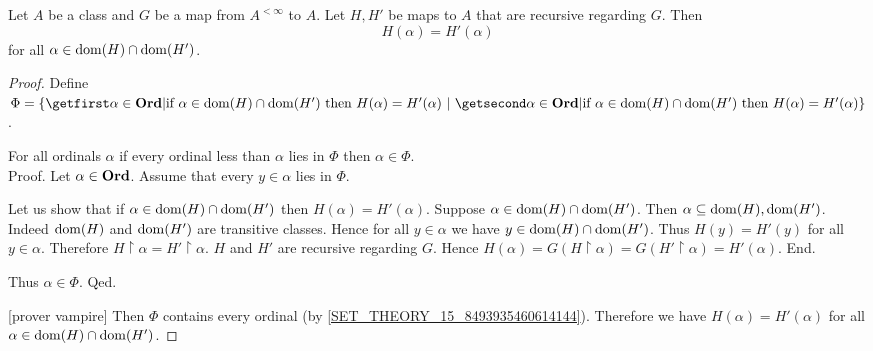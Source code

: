 \documentclass[../../set-theory/set-theory.tex]{subfiles}
\begin{document}
  \begin{forthel}
    \begin{proposition}
      Let $A$ be a class and $G$ be a map from $A^{< \infty}$ to $A$.
      Let $H, H'$ be maps to $A$ that are recursive regarding $G$.
      Then \[ H(\alpha) = H'(\alpha) \]
      for all $\alpha \in \operatorname{dom}(H) \cap \operatorname{dom}(H')$.
    \end{proposition}
    \begin{proof}
      Define $\Phi = \class{\alpha \in \Ord | \text{if $\alpha \in
      \dom(H) \cap \dom(H')$ then $H(\alpha) = H'(\alpha)$}}$.

      For all ordinals $\alpha$ if every ordinal less than $\alpha$ lies in
      $\Phi$ then $\alpha \in \Phi$. \\
      Proof.
        Let $\alpha \in \mathbf{Ord}$.
        Assume that every $y \in \alpha$ lies in $\Phi$.

        Let us show that if $\alpha \in \operatorname{dom}(H) \cap \operatorname{dom}(H')$ then
        $H(\alpha) = H'(\alpha)$.
          Suppose $\alpha \in \operatorname{dom}(H) \cap \operatorname{dom}(H')$.
          Then $\alpha \subseteq \operatorname{dom}(H), \operatorname{dom}(H')$.
          Indeed $\operatorname{dom}(H)$ and $\operatorname{dom}(H')$ are transitive classes.
          Hence for all $y \in \alpha$ we have $y \in \operatorname{dom}(H) \cap \operatorname{dom}(H')$.
          Thus $H(y) = H'(y)$ for all $y \in \alpha$.
          Therefore $H \restriction \alpha = H' \restriction \alpha$.
          $H$ and $H'$ are recursive regarding $G$.
          Hence $H(\alpha)
            = G(H \restriction \alpha)
            = G(H' \restriction \alpha)
            = H'(\alpha)$.
        End.

        Thus $\alpha \in \Phi$.
      Qed.

      [prover vampire]
      Then $\Phi$ contains every ordinal (by
      \cref{SET_THEORY_15_8493935460614144}).
      Therefore we have $H(\alpha) = H'(\alpha)$ for all
      $\alpha \in \operatorname{dom}(H) \cap \operatorname{dom}(H')$.
    \end{proof}
  \end{forthel}
\end{document}
